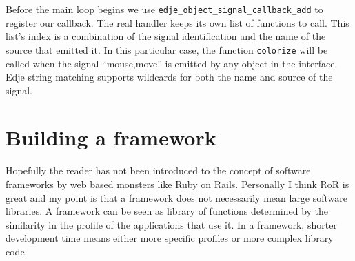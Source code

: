 \documentclass[12pt,a4paper,english]{book}
\begin{document}
Before the main loop begins we use \texttt{edje{\_}object{\_}signal{\_}callback{\_}add} to
register our callback. The real handler keeps its own list of functions to call.
This list's index is a combination of the signal identification and the name of
the source that emitted it. In this particular case, the function \texttt{colorize}
will be called when the signal ``mouse,move'' is emitted by any object in the
interface. Edje string matching supports wildcards for both the name and source
of the signal.



\hypertarget{building-a-framework}{}
\section{Building a framework}

Hopefully the reader has not been introduced to the concept of software
frameworks by web based monsters like Ruby on Rails. Personally I think RoR is
great and my point is that a framework does not necessarily mean large software
libraries. A framework can be seen as library of functions determined by the
similarity in the profile of the applications that use it. In a framework,
shorter development time means either more specific profiles or more complex
library code.
\end{document}
